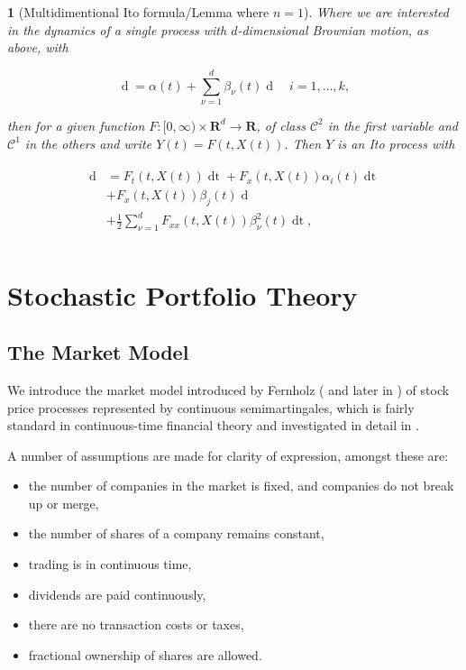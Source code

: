 \documentclass[british]{amsart} \usepackage{lmodern}
\numberwithin{equation}{section} \numberwithin{figure}{section}
\theoremstyle{plain} \newtheorem{thm}{\protect\theoremname}[section]
\theoremstyle{definition} \newtheorem{defn}[thm]{\protect\definitionname}
\theoremstyle{plain} \newtheorem{assumption}[thm]{\protect\assumptionname}
\theoremstyle{plain} \newtheorem{lem}[thm]{\protect\lemmaname}
\theoremstyle{plain} \newtheorem{prop}[thm]{\protect\propositionname}
\theoremstyle{remark} \newtheorem{rem}[thm]{\protect\remarkname}
\theoremstyle{plain} \newtheorem{cor}[thm]{\protect\corollaryname}
\renewcommand{\d}[1]{\mathop{\mathrm{d}{#1}}}
\begin{document}
\begin{cor} [Multidimentional Ito formula/Lemma where $n=1$]
  Where we are interested in the dynamics of a single process
  with $d$-dimensional Brownian motion, as above, with

  \begin{equation}
    \d{X(t)} = \alpha(t) + \sum_{\nu=1}^d \beta_{\nu}(t)\d{W_{\nu}(t)}
    \quad i=1,\dots,k,
  \end{equation}

  then for a given function $F:[0,\infty) \times \mathbf{R}^d \to \mathbf{R}$, of
  class $\mathcal{C}^2$ in the first variable and $\mathcal{C}^1$ in the others
  and write $Y(t)=F(t,X(t))$. Then $Y$ is an Ito process with

  \begin{gather}
    \begin{split}
    \d{Y(t)} &= F_{t}(t, X(t))\d{t} + F_{x}(t,X(t)) \alpha_{i}(t)\d{t} \\
             & + F_{x}(t,X(t)) \beta_{j}(t)\d{W_{j}(t)} \\
             & + \frac{1}{2} \sum_{\nu=1}^d F_{xx}(t,X(t))
                \beta^{2}_{\nu}(t)\d{t},\\
    \end{split}
  \end{gather}
\end{cor}

\newpage
\section{Stochastic Portfolio Theory}

\subsection{The Market Model}

We introduce the market model introduced by Fernholz (\cite{fernholz1999pgf} and
later in \cite{fernholz2009}) of stock price processes represented by continuous
semimartingales, which is fairly standard in continuous-time financial theory
and investigated in detail in \cite{karatzas1998}.

A number of assumptions are made for clarity of expression, amongst these are:

\begin{itemize}
  \item the number of companies in the market is fixed, and companies do not 
        break up or merge,
  \item the number of shares of a company remains constant,
  \item trading is in continuous time,
  \item dividends are paid continuously,
  \item there are no transaction costs or taxes,
  \item fractional ownership of shares are allowed.
\end{itemize}
\end{document}
